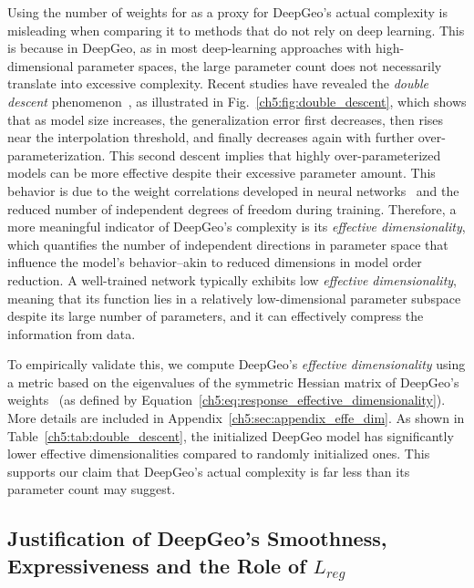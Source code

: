 Using the number of weights for as a proxy for  DeepGeo's actual complexity is misleading when comparing it to methods that do not rely on deep learning. This is because in DeepGeo, as in most deep-learning approaches with high-dimensional parameter spaces,
the large parameter count does not necessarily translate into excessive complexity. Recent studies have revealed the \textit{double descent} phenomenon~\cite{ai.Belkin2019,ai.Spigler2019}, as illustrated in Fig.~\ref{ch5:fig:double_descent}, which shows that as model size increases, the generalization error first decreases, then rises near the interpolation threshold, and finally decreases again with further over-parameterization. This second descent implies that highly over-parameterized models can be more effective despite their excessive parameter amount. This behavior is due to the weight correlations developed in neural networks~\cite{ai.Jin2020b} and the reduced number of independent degrees of freedom during training. Therefore, a more meaningful indicator of DeepGeo's complexity is its \textit{effective dimensionality}, which quantifies the number of independent directions in parameter space that influence the model’s behavior--akin to reduced dimensions in model order reduction. A well-trained network typically exhibits low \textit{effective dimensionality}, meaning that its function lies in a relatively low-dimensional parameter subspace despite its large number of parameters, and it can effectively compress the information from data.


To empirically validate this, we compute DeepGeo’s \textit{effective dimensionality} using a metric based on the eigenvalues of the symmetric Hessian matrix of DeepGeo's weights~\cite{ai.Maddox2020} (as defined by Equation~\ref{ch5:eq:response_effective_dimensionality}). More details are included in Appendix~\ref{ch5:sec:appendix_effe_dim}. As shown in Table~\ref{ch5:tab:double_descent}, the initialized DeepGeo model has significantly lower effective dimensionalities compared to randomly initialized ones. This supports our claim that DeepGeo’s actual complexity is far less than its parameter count may suggest.

\subsection{Justification of DeepGeo's Smoothness, Expressiveness and the Role of $L_{reg}$}

